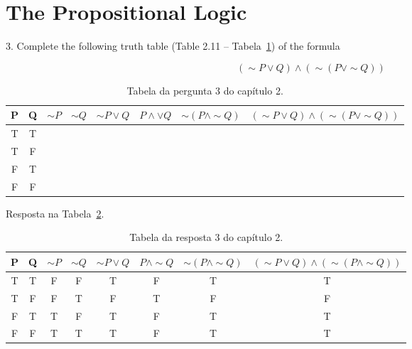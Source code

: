 \section{The Propositional Logic}
3. Complete the following truth table (Table 2.11 -- Tabela~\ref{tab:pergunta2.3}) of the formula

\begin{equation}
 (\sim P \vee Q) \wedge (\sim(P \vee \sim Q))
\end{equation}

\begin{table}[h]
 \begin{tabular}{cccccccc}
  \hline
  P & Q & $\sim P$ & $\sim Q$ & $\sim P \vee Q$ & $P \wedge \vee Q$ & $\sim(P \wedge \sim Q)$ & $(\sim P \vee Q) \wedge (\sim(P \vee \sim Q))$ \\
  \hline
  T & T & & & & & & \\
  T & F & & & & & & \\
  F & T & & & & & & \\
  F & F & & & & & & \\
  \hline
 \end{tabular}
 \caption{Tabela da pergunta 3 do capítulo 2.}
 \label{tab:pergunta2.3}
\end{table}

Resposta na Tabela~\ref{tab:resposta2.3}.

\begin{table}[h]
 \begin{tabular}{cccccccc}
  \hline
  P & Q & $\sim P$ & $\sim Q$ & $\sim P \vee Q$ & $P \wedge \sim Q$ & $\sim(P \wedge \sim Q)$ & $(\sim P \vee Q) \wedge (\sim(P \wedge \sim Q))$ \\
  \hline
  T & T & F & F & T & F & T & T \\
  T & F & F & T & F & T & F & F \\
  F & T & T & F & T & F & T & T \\
  F & F & T & T & T & F & T & T \\
  \hline
 \end{tabular}
 \caption{Tabela da resposta 3 do capítulo 2.}
 \label{tab:resposta2.3}
\end{table}

